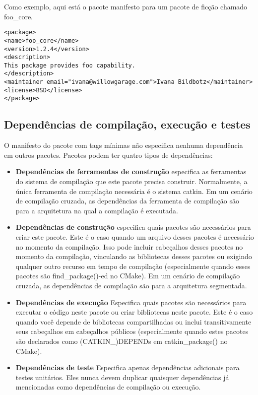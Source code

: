 Como exemplo, aqui está o pacote manifesto para um pacote de ficção chamado foo\_core.


\begin{verbatim}
<package>
<name>foo_core</name>
<version>1.2.4</version>
<description>
This package provides foo capability.
</description>
<maintainer email="ivana@willowgarage.com">Ivana Bildbotz</maintainer>
<license>BSD</license>
</package>
\end{verbatim}

\subsection{Dependências de compilação, execução e testes}

O manifesto do pacote com tags mínimas não especifica nenhuma dependência em outros pacotes. Pacotes podem ter quatro tipos de dependências:

\begin{itemize}
	\setlength{\itemsep}{1pt}
	\setlength{\parskip}{0pt}
	\setlength{\parsep}{0pt}
	\item \textbf{Dependências de ferramentas de construção} 
	especifica as ferramentas do sistema de compilação que este pacote precisa construir. Normalmente, a única ferramenta de compilação necessária é o sistema catkin. Em um cenário de compilação cruzada, as dependências da ferramenta de compilação são para a arquitetura na qual a compilação é executada.
	\item \textbf{Dependências de construção} especifica quais pacotes são necessários para criar este pacote. Este é o caso quando um arquivo desses pacotes é necessário no momento da compilação. Isso pode incluir cabeçalhos desses pacotes no momento da compilação, vinculando as bibliotecas desses pacotes ou exigindo qualquer outro recurso em tempo de compilação (especialmente quando esses pacotes são find\_package()-ed no CMake). Em um cenário de compilação cruzada, as dependências de compilação são para a arquitetura segmentada.
	\item \textbf{Dependências de execução} Especifica quais pacotes são necessários para executar o código neste pacote ou criar bibliotecas neste pacote. Este é o caso quando você depende de bibliotecas compartilhadas ou inclui transitivamente seus cabeçalhos em cabeçalhos públicos (especialmente quando estes pacotes são declarados como (CATKIN\_)DEPENDs em catkin\_package() no CMake).
	\item \textbf{Dependências de teste} Especifica apenas dependências adicionais para testes unitários. Eles nunca devem duplicar quaisquer dependências já mencionadas como dependências de compilação ou execução.
\end{itemize}

